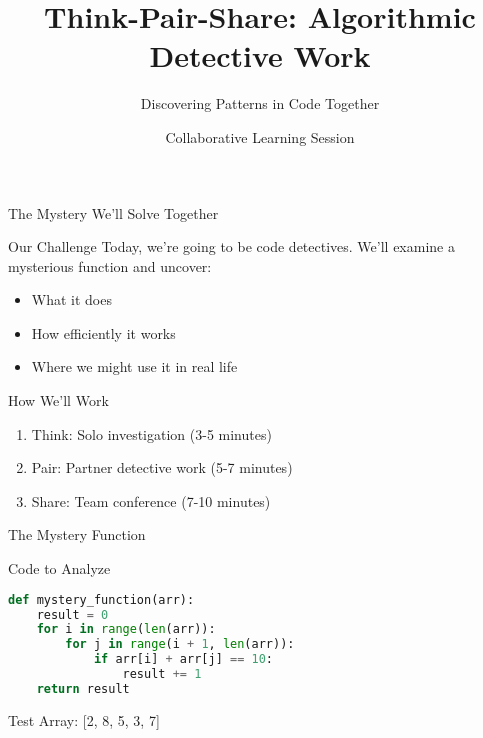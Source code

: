 \documentclass{beamer}
\title[Algorithm Analysis]{Think-Pair-Share: Algorithmic Detective Work}
\subtitle{Discovering Patterns in Code Together}
\author[Student Guide]{Collaborative Learning Session}
\date{}
\begin{document}
\begin{frame}
    \titlepage
\end{frame}

\begin{frame}{The Mystery We'll Solve Together}
    \begin{block}{Our Challenge}
        Today, we're going to be code detectives. We'll examine a mysterious function and uncover:
        \begin{itemize}
            \item What it does
            \item How efficiently it works
            \item Where we might use it in real life
        \end{itemize}
    \end{block}
    
    \begin{alertblock}{How We'll Work}
        \begin{enumerate}
            \item Think: Solo investigation (3-5 minutes)
            \item Pair: Partner detective work (5-7 minutes)
            \item Share: Team conference (7-10 minutes)
        \end{enumerate}
    \end{alertblock}
\end{frame}

\begin{frame}[fragile]{The Mystery Function}
    \begin{block}{Code to Analyze}
        \begin{lstlisting}[language=Python,basicstyle=\ttfamily\small]
def mystery_function(arr):
    result = 0
    for i in range(len(arr)):
        for j in range(i + 1, len(arr)):
            if arr[i] + arr[j] == 10:
                result += 1
    return result
        \end{lstlisting}
    \end{block}
    
    \begin{example}
        Test Array: [2, 8, 5, 3, 7]
    \end{example}
\end{frame}
\end{document}
